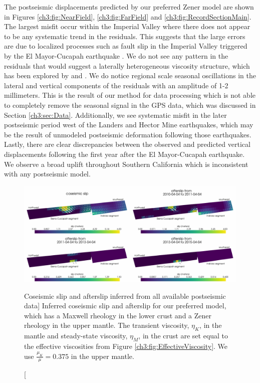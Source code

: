 The postseismic displacements predicted by our preferred Zener model
are shown in Figures \ref{ch3:fig:NearField}, \ref{ch3:fig:FarField}
and \ref{ch3:fig:RecordSectionMain}.  The largest misfit occur within
the Imperial Valley where there does not appear to be any systematic
trend in the residuals.  This suggests that the large errors are due
to localized processes such as fault slip in the Imperial Valley
triggered by the El Mayor-Cucapah earthquake \citep{Wei2011a,Wei2015}.
We do not see any pattern in the residuals that would suggest a
laterally heterogeneous viscosity structure, which has been explored
by \citet{Pollitz2012} and \citet{Rollins2015}.  We do notice regional
scale seasonal oscillations in the lateral and vertical components of
the residuals with an amplitude of 1-2 millimeters.  This is the
result of our method for data processing which is not able to
completely remove the seasonal signal in the GPS data, which was
discussed in Section \ref{ch3:sec:Data}.  Additionally, we see
systematic misfit in the later postseismic period west of the Landers
and Hector Mine earthquakes, which may be the result of unmodeled
postseismic deformation following those earthquakes.  Lastly, there
are clear discrepancies between the observed and predicted vertical
displacements following the first year after the El Mayor-Cucapah
earthquake. We observe a broad uplift throughout Southern California
which is inconsistent with any postseismic model.

\begin{figure}
\includegraphics[scale=0.9]{ch3/figures/2016jb013114-p14}
\caption
[Coseismic slip and afterslip inferred from all available postseismic
data]
{Inferred coseismic slip and afterslip for our preferred
model, which has a Maxwell rheology in the lower crust and a Zener
rheology in the upper mantle.  The transient viscosity, $\eta_K$, in
the mantle and steady-state viscosity, $\eta_M$, in the crust are set
equal to the effective viscosities from Figure
\ref{ch3:fig:EffectiveViscosity}. We use $\frac{\mu_K}{\mu}=0.375$ in
the upper mantle.}
\label{ch3:fig:FinalSlip}
\end{figure}
  
